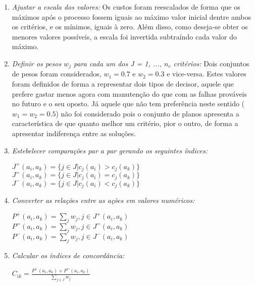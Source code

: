 \begin{enumerate}
	\setlength\itemsep{1em}
	\item {\it Ajustar a escala dos valores:} Os custos foram reescalados de forma que os máximos após o processo fossem iguais ao máximo valor inicial dentre ambos os critérios, e os mínimos, iguais à zero. Além disso, como deseja-se obter os menores valores possíveis, a escala foi invertida subtraíndo cada valor do máximo. 
	
	\item {\it Definir os pesos $w_j$ para cada um dos J = {1, ..., $n_c$} critérios:} Dois conjuntos de pesos foram considerados, $w_1 = 0.7$ e $w_2 = 0.3$ e vice-versa. Estes valores foram definidos de forma a representar dois tipos de decisor, aquele que prefere gastar menos agora com manutenção do que com as falhas prováveis no futuro e o seu oposto. Já aquele que não tem preferência neste sentido ($w_1 = w_2 = 0.5$) não foi considerado pois o conjunto de planos apresenta a característica de que quanto melhor um critério, pior o outro, de forma a apresentar indiferença entre as soluções.
	
	\item {\it Estebelecer comparações par a par gerando os seguintes índices:}
	
	\begin{center}
		$J^+(a_i, a_k) =  \{j \in J | c_j(a_i) > c_j(a_k)\}$\\
		$J^=(a_i, a_k) =  \{j \in J | c_j(a_i) = c_j(a_k)\}$\\
		$J^-(a_i, a_k) =  \{j \in J | c_j(a_i) < c_j(a_k)\}$\\
	\end{center}
	
	\item {\it Converter as relações entre as ações em valores numéricos:}
	
	\begin{center}
		$P^+(a_i, a_k) = \sum_{j}{} w_j, j \in J^+(a_i, a_k)$\\
		$P^=(a_i, a_k) = \sum_{j}{} w_j, j \in J^=(a_i, a_k)$\\
		$P^-(a_i, a_k) = \sum_{j}{} w_j, j \in J^-(a_i, a_k)$\\
	\end{center}
	
	\item {\it Calcular os índices de concordância:}
	
	\begin{center}
		$C_{ik} = \frac{P^+(a_i, a_k) + P^=(a_i, a_k)}{\sum_{j \in J}w_j}$\\
	\end{center}
	

\end{enumerate}
